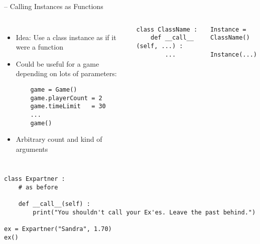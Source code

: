 
\begin{frame}[fragile]{ -- Calling Instances as Functions}
%
\begin{columns}[T]
%
\begin{itemize}
\item Idea: Use a class instance as if it were a function
\item Could be useful for a game depending on lots of parameters:
	\begin{verbatim}
	game = Game()
	game.playerCount = 2
	game.timeLimit   = 30
	...
	game()
	\end{verbatim}
\item Arbitrary count and kind of arguments
\end{itemize}
%
\begin{codebox}
\begin{verbatim}
class ClassName :
    def __call__ (self, ...) :
        ...
\end{verbatim}
\end{codebox}
%
\begin{codebox}
\begin{verbatim}
Instance = ClassName()

Instance(...)
\end{verbatim}
\end{codebox}
\end{columns}
%
\end{frame}


\begin{frame}[fragile]
%
\begin{codebox}
\begin{verbatim}
class Expartner :
    # as before
    
    def __call__(self) :
        print("You shouldn't call your Ex'es. Leave the past behind.")

ex = Expartner("Sandra", 1.70)
ex()
\end{verbatim}
\end{codebox}
%
\end{frame}